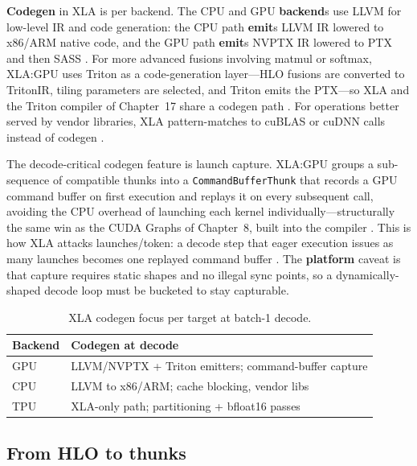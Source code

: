 \textbf{Codegen} in XLA is per backend. The CPU and GPU \textbf{backend}s use LLVM for low-level IR and code generation: the CPU path \textbf{emit}s LLVM IR lowered to x86/ARM native code, and the GPU path \textbf{emit}s NVPTX IR lowered to PTX and then SASS \citep{openxla2024}. For more advanced fusions involving matmul or softmax, XLA:GPU uses Triton as a code-generation layer---HLO fusions are converted to TritonIR, tiling parameters are selected, and Triton emits the PTX---so XLA and the Triton compiler of Chapter~17 share a codegen path \citep{openxla2024,tillet2019triton}. For operations better served by vendor libraries, XLA pattern-matches to cuBLAS or cuDNN calls instead of codegen \citep{openxla2024}.

The decode-critical codegen feature is launch capture. XLA:GPU groups a sub-sequence of compatible thunks into a \texttt{CommandBufferThunk} that records a GPU command buffer on first execution and replays it on every subsequent call, avoiding the CPU overhead of launching each kernel individually---structurally the same win as the CUDA Graphs of Chapter~8, built into the compiler \citep{openxla2024,nvidia2024cudagraphs}. This is how XLA attacks launches/token: a decode step that eager execution issues as many launches becomes one replayed command buffer \citep{taxbreak2026,memoryfloor2026}. The \textbf{platform} caveat is that capture requires static shapes and no illegal sync points, so a dynamically-shaped decode loop must be bucketed to stay capturable.

\begin{table}[t]
\centering
\small
\begin{tabular}{@{}ll@{}}
\toprule
\textbf{Backend} & \textbf{Codegen at decode} \\
\midrule
GPU & LLVM/NVPTX + Triton emitters; command-buffer capture \\
CPU & LLVM to x86/ARM; cache blocking, vendor libs \\
TPU & XLA-only path; partitioning + bfloat16 passes \\
\bottomrule
\end{tabular}
\caption{XLA codegen focus per target at batch-1 decode.}
\label{tab:ch15_codegen_backend}
\end{table}

\subsection{From HLO to thunks}

